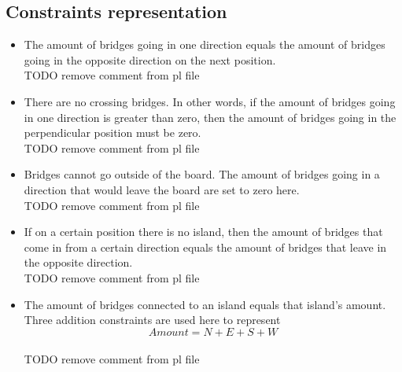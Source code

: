 \documentclass{report}
\begin{document}
\subsection{Constraints representation}
\begin{itemize}
	\item The amount of bridges going in one direction equals the amount of bridges going in the opposite direction on the next position. 
	    \\TODO remove comment from pl file
		
	\item There are no crossing bridges. In other words, if the amount of bridges going in one direction is greater than zero, then the amount of bridges going in the perpendicular position must be zero.
	    \\TODO remove comment from pl file
		
	\item Bridges cannot go outside of the board. The amount of bridges going in a direction that would leave the board are set to zero here.
	    \\TODO remove comment from pl file
        
	\item If on a certain position there is no island, then the amount of bridges that come in from a certain direction equals the amount of bridges that leave in the opposite direction.
	    \\TODO remove comment from pl file
        
	\item The amount of bridges connected to an island equals that island's amount. Three addition constraints are used here to represent \[ Amount = N + E + S + W \]
	    \\TODO remove comment from pl file
        
\end{itemize}
\end{document}
